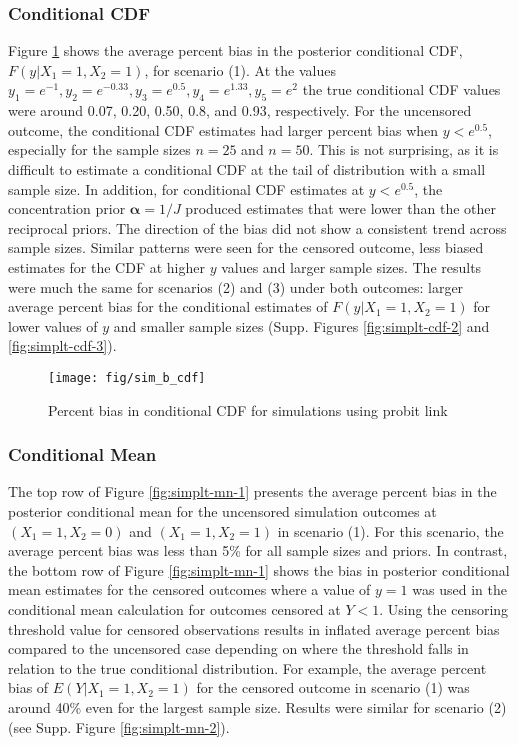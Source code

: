 \documentclass[
]{article}
\begin{document}
\hypertarget{conditional-cdf}{%
\subsubsection{Conditional CDF}\label{conditional-cdf}}

Figure \ref{fig:simplt-cdf-1} shows the average percent bias in the posterior conditional CDF, \(F(y|X_1=1,X_2=1)\), for scenario (1). At the values \(y_1=e^{-1},y_2=e^{-0.33},y_3=e^{0.5},y_4=e^{1.33},y_5=e^2\) the true conditional CDF values were around 0.07, 0.20, 0.50, 0.8, and 0.93, respectively. For the uncensored outcome, the conditional CDF estimates had larger percent bias when \(y<e^{0.5}\), especially for the sample sizes \(n=25\) and \(n=50\). This is not surprising, as it is difficult to estimate a conditional CDF at the tail of distribution with a small sample size. In addition, for conditional CDF estimates at \(y<e^{0.5}\), the concentration prior \(\boldsymbol{\alpha}=1/J\) produced estimates that were lower than the other reciprocal priors. The direction of the bias did not show a consistent trend across sample sizes. Similar patterns were seen for the censored outcome, less biased estimates for the CDF at higher \(y\) values and larger sample sizes. The results were much the same for scenarios (2) and (3) under both outcomes: larger average percent bias for the conditional estimates of \(F(y|X_1=1,X_2=1)\) for lower values of \(y\) and smaller sample sizes (Supp. Figures \ref{fig:simplt-cdf-2} and \ref{fig:simplt-cdf-3}).

\begin{figure}

{\centering \texttt{[image: fig/sim\_b\_cdf]} 

}

\caption{Percent bias in conditional CDF for simulations using probit link}\label{fig:simplt-cdf-1}
\end{figure}

\hypertarget{conditional-mean}{%
\subsubsection{Conditional Mean}\label{conditional-mean}}

The top row of Figure \ref{fig:simplt-mn-1} presents the average percent bias in the posterior conditional mean for the uncensored simulation outcomes at \((X_1=1,X_2=0)\) and \((X_1=1,X_2=1)\) in scenario (1). For this scenario, the average percent bias was less than 5\% for all sample sizes and priors. In contrast, the bottom row of Figure \ref{fig:simplt-mn-1} shows the bias in posterior conditional mean estimates for the censored outcomes where a value of \(y=1\) was used in the conditional mean calculation for outcomes censored at \(Y<1\). Using the censoring threshold value for censored observations results in inflated average percent bias compared to the uncensored case depending on where the threshold falls in relation to the true conditional distribution. For example, the average percent bias of \(E(Y|X_1=1,X_2=1)\) for the censored outcome in scenario (1) was around 40\% even for the largest sample size. Results were similar for scenario (2) (see Supp. Figure \ref{fig:simplt-mn-2}).
\end{document}
